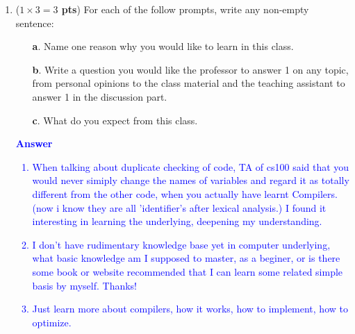\documentclass[10pt]{article}
\newcommand {\pts}[1]{({\bf #1 pts})}
\begin{document}
\begin{enumerate}
    \item \pts{$1\times3 = 3$} For each of the follow prompts, write any non-empty sentence:
          \begin{enumerate}
              \item[\textbf{a}.] Name one reason why you would like to learn in this class.
              \item[\textbf{b}.] Write a question you would like the professor to answer 1 on any topic, from personal opinions to the class material and the teaching assistant to answer 1 in the discussion part.
              \item[\textbf{c}.] What do you expect from this class.
          \end{enumerate}
          \textcolor{blue}{
              \textbf{Answer}
              \begin{enumerate}
                  \item When talking about duplicate checking of code, TA of cs100 said that you would never simiply change the names of variables and regard it as totally different from the other code, when you actually have learnt Compilers. (now i know they are all 'identifier's after lexical analysis.) I found it interesting in learning the underlying, deepening my understanding.
                  \item I don't have rudimentary knowledge base yet in computer underlying, what basic knowledge am I supposed to master, as a beginer, or is there some book or website recommended that I can learn some related simple basis by myself. Thanks!
                  \item Just learn more about compilers, how it works, how to implement, how to optimize.
              \end{enumerate}
          }



\end{enumerate}
\end{document}
